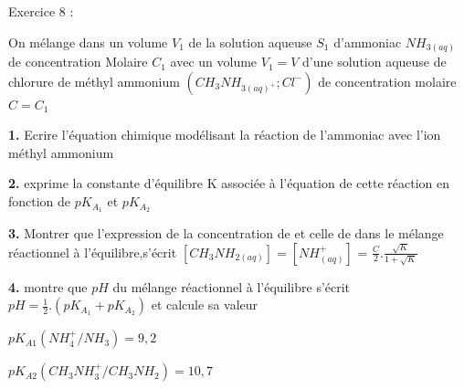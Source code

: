 \documentclass[12pt, french]{article}
\begin{document}
\begin{Box2}{Exercice 8 : }

On mélange dans un volume $V_1$ de la solution aqueuse $S_1$ d’ammoniac
$NH_{3(aq)}$ de concentration Molaire $C_1$ avec un volume $V_1 = V$
d’une solution aqueuse de chlorure de méthyl ammonium $(CH_3NH_{3(aq)^+} ; Cl^-)$ de concentration molaire $C=C_1$

\textbf{1. }Ecrire l’équation chimique modélisant la réaction de
l’ammoniac avec l’ion méthyl ammonium

\textbf{2. }exprime la constante d’équilibre K associée à l’équation de cette réaction en fonction de $pK_{A_1}$ et $pK_{A_2}$ 

\textbf{3. }Montrer que l’expression de la concentration de et celle de dans le mélange réactionnel à l’équilibre,s’écrit $[CH_3NH_{2(aq)}] = [NH_{(aq)}^+]$ = $\frac{C}{2}.\frac{\sqrt{K}}{1+\sqrt{K}}$


\textbf{4. } montre que $pH$ du mélange réactionnel à l’équilibre s’écrit $pH = \frac{1}{2}.(pK_{A_1} + pK_{A_2})$ et calcule sa valeur

$pK_{A1}(NH_4^+/NH_3)=9,2$

$pK_{A2}(CH_3NH_3^+/CH_3NH_2) = 10,7$

\end{Box2}
\end{document}
